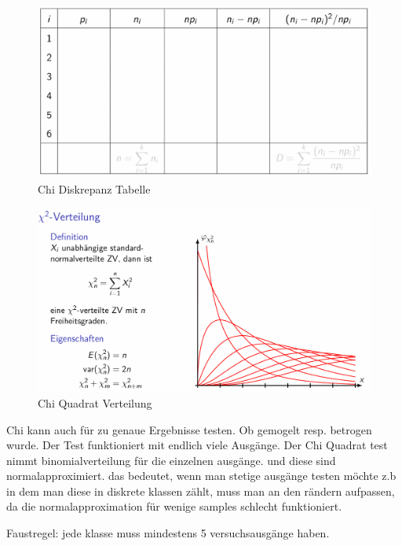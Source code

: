 \documentclass[../Main.tex]{subfiles}
\begin{document}
\begin{figure}[H]
    \centering
    \includegraphics[width=1\linewidth]{Images/diskrepanz-tabelle.png}
    \caption{Chi Diskrepanz Tabelle}
\end{figure}

\begin{figure}[H]
    \centering
    \includegraphics[width=1\linewidth]{Images/x-verteilung.png}
    \caption{Chi Quadrat Verteilung}
\end{figure}

Chi kann auch für zu genaue Ergebnisse testen. Ob gemogelt resp. betrogen wurde.
Der Test funktioniert mit endlich viele Ausgänge.
Der Chi Quadrat test nimmt binomialverteilung für die einzelnen ausgänge.
und diese sind normalapproximiert. das bedeutet, wenn man stetige ausgänge testen
möchte z.b in dem man diese in diskrete klassen zählt, muss man an den rändern aufpassen,
da die normalapproximation für wenige samples schlecht funktioniert.

Faustregel: jede klasse muss mindestens 5 versuchsausgänge haben.
\end{document}
